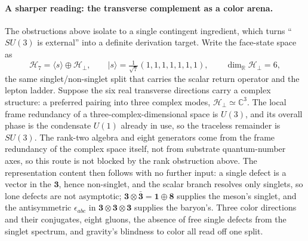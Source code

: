 \documentclass[11pt]{article}
\begin{document}
\paragraph{A sharper reading: the transverse complement as a color arena.}
The obstructions above isolate to a single contingent ingredient, which turns ``$SU(3)$ is external'' into a definite derivation target. Write the face-state space as
\[
\mathcal H_7=\langle s\rangle\oplus\mathcal H_\perp,\qquad |s\rangle=\tfrac{1}{\sqrt7}(1,1,1,1,1,1,1),\qquad \dim_{\mathbb R}\mathcal H_\perp=6,
\]
the same singlet/non-singlet split that carries the scalar return operator and the lepton ladder. Suppose the six real transverse directions carry a complex structure: a preferred pairing into three complex modes, $\mathcal H_\perp\simeq\mathbb C^3$. The local frame redundancy of a three-complex-dimensional space is $U(3)$, and its overall phase is the condensate $U(1)$ already in use, so the traceless remainder is $SU(3)$. The rank-two algebra and eight generators come from the frame redundancy of the complex space itself, not from substrate quantum-number axes, so this route is not blocked by the rank obstruction above. The representation content then follows with no further input: a single defect is a vector in the $\mathbf 3$, hence non-singlet, and the scalar branch resolves only singlets, so lone defects are not asymptotic; $\mathbf 3\otimes\bar{\mathbf 3}=\mathbf 1\oplus\mathbf 8$ supplies the meson's singlet, and the antisymmetric $\epsilon_{abc}$ in $\mathbf 3\otimes\mathbf 3\otimes\mathbf 3$ supplies the baryon's. Three color directions and their conjugates, eight gluons, the absence of free single defects from the singlet spectrum, and gravity's blindness to color all read off one split.
\end{document}
